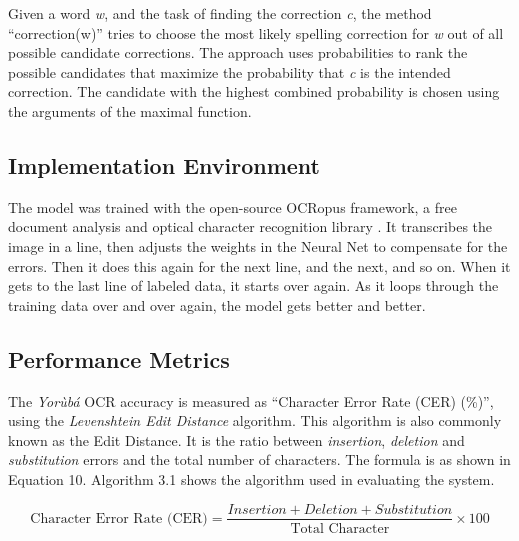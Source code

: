 \documentclass[review]{elsarticle}
\newcommand{\q}[1]{``#1''}
\newcommand{\yor}{\textit{Yor\`ub\'a }}
\begin{document}
Given a word \textit{w}, and the task of finding the correction \textit{c}, the method \q{correction(w)} tries to choose the most likely spelling correction for \textit{w} out of all possible candidate corrections. The approach uses probabilities to rank the possible candidates that maximize the probability that \textit{c} is the intended correction. The candidate with the highest combined probability is chosen using the arguments of the maximal function. 

\subsection{Implementation Environment}

The model was trained with the open-source OCRopus framework, a free document analysis and optical character recognition library \cite{breuel2008ocropus}. It transcribes the image in a line, then adjusts the weights in the Neural Net to compensate for the errors. Then it does this again for the next line, and the next, and so on. When it gets to the last line of labeled data, it starts over again. As it loops through the training data over and over again, the model gets better and better.

\subsection{Performance Metrics}
The \yor OCR accuracy is measured as \q{Character Error Rate (CER) (\%)}, using the \textit{Levenshtein Edit Distance} algorithm. This algorithm is also commonly known as the Edit Distance. It is the ratio between \textit{insertion}, \textit{deletion} and \textit{substitution} errors and the total number of characters. The formula is as shown in Equation 10. Algorithm 3.1 shows the algorithm used in evaluating the system.

\begin{equation}\label{key}
\text{Character Error Rate (CER)} = \frac{Insertion + Deletion + Substitution}{\text{Total Character}} \times 100 
\end{equation}

\clearpage
\end{document}
